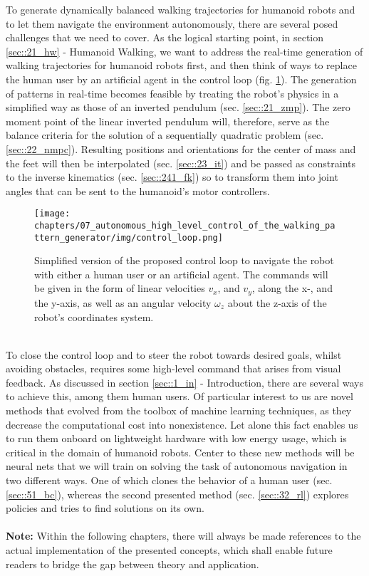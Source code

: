 \label{sec::2_bg}
To generate dynamically balanced walking trajectories for humanoid robots and to let them navigate the environment autonomously, there are several posed challenges that we need to cover. As the logical starting point, in section \ref{sec::21_hw} - Humanoid Walking, we want to address the real-time generation of walking trajectories for humanoid robots first, and then think of ways to replace the human user by an artificial agent in the control loop (fig. \ref{fig::2_cl}). The generation of patterns in real-time becomes feasible by treating the robot's physics in a simplified way as those of an inverted pendulum (sec. \ref{sec::21_zmp}). The zero moment point of the linear inverted pendulum will, therefore, serve as the balance criteria for the solution of a sequentially quadratic problem (sec. \ref{sec::22_nmpc}).  Resulting positions and orientations for the center of mass and the feet will then be interpolated (sec. \ref{sec::23_it}) and be passed as constraints to the inverse kinematics (sec. \ref{sec::241_fk}) so to transform them into joint angles that can be sent to the humanoid's motor controllers.
\begin{figure}[h!]
	\centering
	\texttt{[image: chapters/07\_autonomous\_high\_level\_control\_of\_the\_walking\_pattern\_generator/img/control\_loop.png]}
	\caption{Simplified version of the proposed control loop to navigate the robot with either a human user or an artificial agent. The commands will be given in the form of linear velocities $v_x$, and $v_y$, along the x-, and the y-axis, as well as an angular velocity $\omega_z$ about the z-axis of the robot's coordinates system.}
	\label{fig::2_cl}
\end{figure}
\\
To close the control loop and to steer the robot towards desired goals, whilst avoiding obstacles, requires some high-level command that arises from visual feedback. As discussed in section \ref{sec::1_in} - Introduction, there are several ways to achieve this, among them human users. Of particular interest to us are novel methods that evolved from the toolbox of machine learning techniques, as they decrease the computational cost into nonexistence. Let alone this fact enables us to run them onboard on lightweight hardware with low energy usage, which is critical in the domain of humanoid robots. Center to these new methods will be neural nets that we will train on solving the task of autonomous navigation in two different ways. One of which clones the behavior of a human user (sec. \ref{sec::51_bc}), whereas the second presented method (sec. \ref{sec::32_rl}) explores policies and tries to find solutions on its own.
\\\\
\textbf{Note:} Within the following chapters, there will always be made references to the actual implementation of the presented concepts, which shall enable future readers to bridge the gap between theory and application.